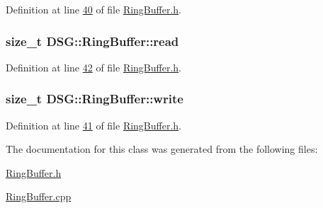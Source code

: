 Definition at line \hyperlink{_ring_buffer_8h_source_l00040}{40} of file \hyperlink{_ring_buffer_8h_source}{Ring\+Buffer.\+h}.

\hypertarget{class_d_s_g_1_1_ring_buffer_a34bc659c286c8913e318c0e8c0777204}{
\subsubsection[{read}]{\setlength{\rightskip}{0pt plus 5cm}size\+\_\+t D\+S\+G\+::\+Ring\+Buffer\+::read\hspace{0.3cm}{\ttfamily [protected]}}}\label{class_d_s_g_1_1_ring_buffer_a34bc659c286c8913e318c0e8c0777204}


Definition at line \hyperlink{_ring_buffer_8h_source_l00042}{42} of file \hyperlink{_ring_buffer_8h_source}{Ring\+Buffer.\+h}.

\hypertarget{class_d_s_g_1_1_ring_buffer_a703434b6afb87f1f9a05750278a822e3}{
\subsubsection[{write}]{\setlength{\rightskip}{0pt plus 5cm}size\+\_\+t D\+S\+G\+::\+Ring\+Buffer\+::write\hspace{0.3cm}{\ttfamily [protected]}}}\label{class_d_s_g_1_1_ring_buffer_a703434b6afb87f1f9a05750278a822e3}


Definition at line \hyperlink{_ring_buffer_8h_source_l00041}{41} of file \hyperlink{_ring_buffer_8h_source}{Ring\+Buffer.\+h}.



The documentation for this class was generated from the following files\+:\begin{DoxyCompactItemize}
\item 
\hyperlink{_ring_buffer_8h}{Ring\+Buffer.\+h}\item 
\hyperlink{_ring_buffer_8cpp}{Ring\+Buffer.\+cpp}\end{DoxyCompactItemize}
